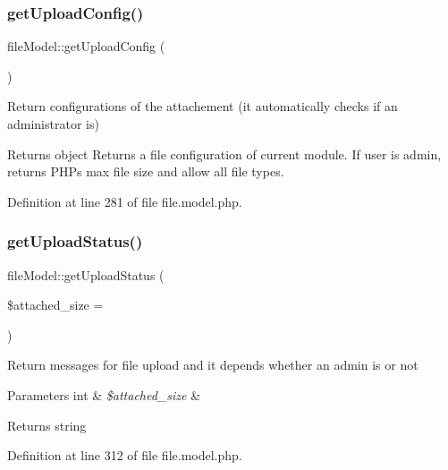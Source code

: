\subsubsection{\texorpdfstring{get\+Upload\+Config()}{getUploadConfig()}}
{\footnotesize\ttfamily file\+Model\+::get\+Upload\+Config (\begin{DoxyParamCaption}{ }\end{DoxyParamCaption})}

Return configurations of the attachement (it automatically checks if an administrator is)

\begin{DoxyReturn}{Returns}
object Returns a file configuration of current module. If user is admin, returns P\+HP\textquotesingle{}s max file size and allow all file types. 
\end{DoxyReturn}


Definition at line 281 of file file.\+model.\+php.

\mbox{\label{classfileModel_a63c3d6b41db33e55521cd3f0b10ab493}} 
\subsubsection{\texorpdfstring{get\+Upload\+Status()}{getUploadStatus()}}
{\footnotesize\ttfamily file\+Model\+::get\+Upload\+Status (\begin{DoxyParamCaption}\item[{}]{\$attached\+\_\+size = {} }\end{DoxyParamCaption})}

Return messages for file upload and it depends whether an admin is or not


\begin{DoxyParams}[1]{Parameters}
int & {\em \$attached\+\_\+size} & \\
\hline
\end{DoxyParams}
\begin{DoxyReturn}{Returns}
string 
\end{DoxyReturn}


Definition at line 312 of file file.\+model.\+php.

\mbox{\label{classfileModel_a5dd9542d5c0ed61a7dd0158900ff5c92}} 

